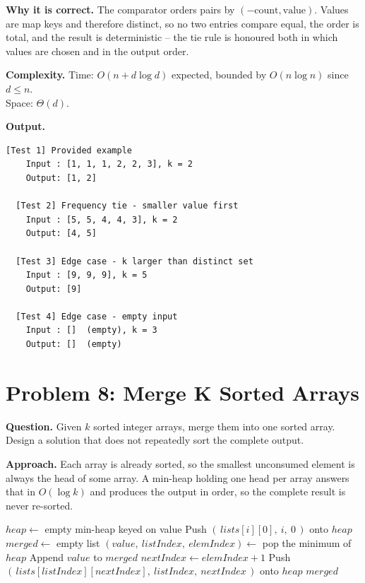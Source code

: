 \documentclass[11pt]{article}
\begin{document}
\textbf{Why it is correct.} The comparator orders pairs by $(-\text{count}, \text{value})$. Values are map keys and therefore distinct, so no two entries compare equal, the order is total, and the result is deterministic -- the tie rule is honoured both in which values are chosen and in the output order.

\textbf{Complexity.} Time: $O(n + d\log d)$ expected, bounded by $O(n\log n)$ since $d \le n$.\\
Space: $\Theta(d)$.

\textbf{Output.}

\begin{lstlisting}[style=term]
  [Test 1] Provided example
    Input : [1, 1, 1, 2, 2, 3], k = 2
    Output: [1, 2]

  [Test 2] Frequency tie - smaller value first
    Input : [5, 5, 4, 4, 3], k = 2
    Output: [4, 5]

  [Test 3] Edge case - k larger than distinct set
    Input : [9, 9, 9], k = 5
    Output: [9]

  [Test 4] Edge case - empty input
    Input : []  (empty), k = 3
    Output: []  (empty)
\end{lstlisting}

\newpage

\section*{Problem 8: Merge K Sorted Arrays}
\textbf{Question.} Given $k$ sorted integer arrays, merge them into one sorted array. Design a solution that does not repeatedly sort the complete output.

\textbf{Approach.} Each array is already sorted, so the smallest unconsumed element is always the head of some array. A min-heap holding one head per array answers that in $O(\log k)$ and produces the output in order, so the complete result is never re-sorted.

\begin{algorithm}[H]
\caption{Merge K Sorted Arrays}
\begin{algorithmic}[1]
    \State $heap \gets$ empty min-heap keyed on value
            \State Push $(\,lists[i][0],\ i,\ 0\,)$ onto $heap$
        \EndIf
    \EndFor
    \State $merged \gets$ empty list
        \State $(value,\ listIndex,\ elemIndex) \gets$ pop the minimum of $heap$
        \State Append $value$ to $merged$
        \State $nextIndex \gets elemIndex + 1$
            \State Push $(\,lists[listIndex][nextIndex],\ listIndex,\ nextIndex\,)$ onto $heap$
        \EndIf
    \EndWhile
    \State \Return $merged$
\EndFunction
\end{algorithmic}
\end{algorithm}
\end{document}
